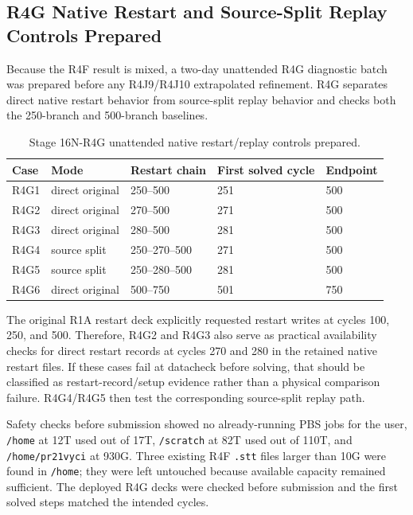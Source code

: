 \documentclass[11pt,a4paper]{article}
\newcommand{\code}[1]{\texttt{#1}}
\begin{document}
\subsection{R4G Native Restart and Source-Split Replay Controls Prepared}

Because the R4F result is mixed, a two-day unattended R4G diagnostic batch was prepared before any R4J9/R4J10 extrapolated refinement. R4G separates direct native restart behavior from source-split replay behavior and checks both the 250-branch and 500-branch baselines.

\begin{table}[H]
\centering
\caption{Stage 16N-R4G unattended native restart/replay controls prepared.}
\begin{tabular}{lllll}
\toprule
Case & Mode & Restart chain & First solved cycle & Endpoint \\
\midrule
R4G1 & direct original & 250--500 & 251 & 500 \\
R4G2 & direct original & 270--500 & 271 & 500 \\
R4G3 & direct original & 280--500 & 281 & 500 \\
R4G4 & source split & 250--270--500 & 271 & 500 \\
R4G5 & source split & 250--280--500 & 281 & 500 \\
R4G6 & direct original & 500--750 & 501 & 750 \\
\bottomrule
\end{tabular}
\end{table}

The original R1A restart deck explicitly requested restart writes at cycles 100, 250, and 500. Therefore, R4G2 and R4G3 also serve as practical availability checks for direct restart records at cycles 270 and 280 in the retained native restart files. If these cases fail at datacheck before solving, that should be classified as restart-record/setup evidence rather than a physical comparison failure. R4G4/R4G5 then test the corresponding source-split replay path.

Safety checks before submission showed no already-running PBS jobs for the user, \code{/home} at 12T used out of 17T, \code{/scratch} at 82T used out of 110T, and \code{/home/pr21vyci} at 930G. Three existing R4F \code{.stt} files larger than 10G were found in \code{/home}; they were left untouched because available capacity remained sufficient. The deployed R4G decks were checked before submission and the first solved steps matched the intended cycles.
\end{document}
